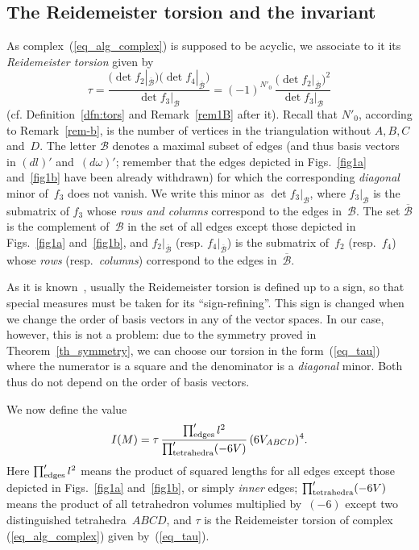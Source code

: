 \documentclass[pdftex]{sigma}
\begin{document}
\subsection{The Reidemeister torsion and the invariant}
\label{subsec-torsion-invariant}

As complex~(\ref{eq_alg_complex}) is supposed to be acyclic, we associate to it its \emph{Reidemeister torsion} given by
\begin{equation}
\tau = \frac{\bigl(\det f_2 |_{\overline{\mathcal B}}\bigr) \bigl(\det f_4 |_{\overline{\mathcal B}}\bigr)}{\det f_3 |_{\mathcal B}} = (-1)^{N'_0}\, \frac{\bigl(\det f_2 |_{\overline{\mathcal B}}\bigr)^2}{\det f_3 |_{\mathcal B}}
\label{eq_tau}
\end{equation}
(cf. Def\/inition~\ref{dfn:tors} and Remark~\ref{rem1B} after it). Recall that $N'_0$, according to Remark~\ref{rem-b}, is the number of vertices in the triangulation without $A,B,C$ and~$D$. The letter $\mathcal B$ denotes a maximal subset of edges (and thus basis vectors in $(dl)'$ and~$(d\omega)'$; remember that the edges depicted in Figs.~\ref{fig1a} and~\ref{fig1b} have been already withdrawn) for which the corresponding \emph{ diagonal} minor of~$f_3$ does not vanish. We write this minor as $\det f_3|_{\mathcal B}$, where $f_3|_{\mathcal B}$ is the submatrix of $f_3$ whose \emph{rows and columns} correspond to the edges in~$\mathcal B$. The set $\overline{\mathcal B}$ is the complement of~$\mathcal B$ in the set of all edges except those depicted in Figs.~\ref{fig1a} and~\ref{fig1b}, and $f_2|_{\overline{\mathcal B}}$ (resp. $f_4|_{\overline{\mathcal B}}$) is the submatrix of~$f_2$ (resp.~$f_4$) whose \emph{rows} (resp.\ \emph{columns}) correspond to the edges in~$\overline{\mathcal B}$.

\begin{remark}
\label{remark_sign}
As it is known~\cite{Turaev:2001}, usually the Reidemeister torsion is def\/ined up to a sign, so that special measures must be taken for its ``sign-ref\/ining''. This sign is changed when we change the order of basis vectors in any of the vector spaces. In our case, however, this is not a problem: due to the symmetry proved in Theorem~\ref{th_symmetry}, we can choose our torsion in the form~(\ref{eq_tau}) where the numerator is a square and the denominator is a \emph{diagonal} minor. Both thus do not depend on the order of basis vectors.
\end{remark}

We now def\/ine the value
\begin{equation}
I(M) = \tau\, \frac{\prod_{\rm edges}' l^2}{\prod_{\rm tetrahedra}' (-6V)}\, (6V_{ABCD})^4.
\label{eq_invariant}
\end{equation}
Here $\prod_{\rm edges}' l^2$ means the product of squared lengths for all edges except those depicted in Figs.~\ref{fig1a} and~\ref{fig1b}, or simply \emph{inner} edges; $\prod_{\rm tetrahedra}' (-6V)$ means the product of all tetrahedron volumes multiplied by~$(-6)$ except two distinguished tetrahedra~$ABCD$, and $\tau$ is the Reidemeister torsion of complex (\ref{eq_alg_complex}) given by~(\ref{eq_tau}).
\end{document}
